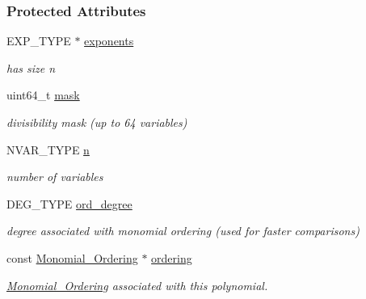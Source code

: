 \subsubsection*{Protected Attributes}
\begin{DoxyCompactItemize}
\item 
\mbox{\label{group__polygroup_aa9f256d751e5b6cbd08c191776a28a00}} 
E\+X\+P\+\_\+\+T\+Y\+PE $\ast$ \hyperlink{group__polygroup_aa9f256d751e5b6cbd08c191776a28a00}{exponents}
\begin{DoxyCompactList}\small\item\em has size n \end{DoxyCompactList}\item 
\mbox{\label{group__polygroup_a4604f87abf09804a494bd6f92aa46453}} 
uint64\+\_\+t \hyperlink{group__polygroup_a4604f87abf09804a494bd6f92aa46453}{mask}
\begin{DoxyCompactList}\small\item\em divisibility mask (up to 64 variables) \end{DoxyCompactList}\item 
\mbox{\label{group__polygroup_a5c874cbc4af0c5a5b43afd0adb176156}} 
N\+V\+A\+R\+\_\+\+T\+Y\+PE \hyperlink{group__polygroup_a5c874cbc4af0c5a5b43afd0adb176156}{n}
\begin{DoxyCompactList}\small\item\em number of variables \end{DoxyCompactList}\item 
\mbox{\label{group__polygroup_ae892a9cd924012b0c5089c2022bc0b29}} 
D\+E\+G\+\_\+\+T\+Y\+PE \hyperlink{group__polygroup_ae892a9cd924012b0c5089c2022bc0b29}{ord\+\_\+degree}
\begin{DoxyCompactList}\small\item\em degree associated with monomial ordering (used for faster comparisons) \end{DoxyCompactList}\item 
\mbox{\label{group__polygroup_a37570ef546000082a25136c499462cea}} 
const \hyperlink{group__orderinggroup_class_monomial___ordering}{Monomial\+\_\+\+Ordering} $\ast$ \hyperlink{group__polygroup_a37570ef546000082a25136c499462cea}{ordering}
\begin{DoxyCompactList}\small\item\em \hyperlink{group__orderinggroup_class_monomial___ordering}{Monomial\+\_\+\+Ordering} associated with this polynomial. \end{DoxyCompactList}\item 

\end{DoxyCompactItemize}
